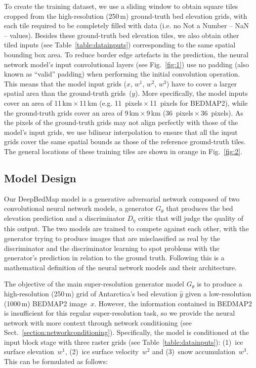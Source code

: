 \documentclass[tc, noline]{copernicus}
\begin{document}
To create the training dataset, we use a sliding window to obtain square tiles cropped from the high-resolution (250\,\unit{m}) ground-truth bed elevation grids, with each tile required to be completely filled with data (i.e.
no Not a Number -- NaN -- values).
Besides these ground-truth bed elevation tiles, we also obtain other tiled inputs (see Table~\ref{table:datainputs}) corresponding to the same spatial bounding box area.
To reduce border edge artefacts in the prediction, the neural network model's input convolutional layers (see Fig.~\ref{fig:1}) use no padding (also known as ``valid'' padding) when performing the initial convolution operation.
This means that the model input grids ($x$, $w^1$, $w^2$, $w^3$) have to cover a larger spatial area than the ground-truth grids~($y$).
More specifically, the model inputs cover an area of 11\,\unit{km}\,$\times$\,11\,\unit{km} (e.g. 11~\unit{pixels}\,$\times$\,11~\unit{pixels} for BEDMAP2), while the ground-truth grids cover an area of 9\,\unit{km}\,$\times$\,9\,\unit{km} (36~\unit{pixels}\,$\times$\,36~\unit{pixels}).
As the pixels of the ground-truth grids may not align perfectly with those of the model's input grids, we use bilinear interpolation to ensure that all the input grids cover the same spatial bounds as those of the reference ground-truth tiles.
The general locations of these training tiles are shown in orange in Fig.~\ref{fig:2}.

\subsection{Model Design} \label{section:modeldesign}

Our DeepBedMap model is a generative adversarial network \citep{GoodfellowGenerativeAdversarialNetworks2014} composed of two convolutional neural network models, a generator $G_\theta$ that produces the bed elevation prediction and a discriminator $D_\eta$ critic that will judge the quality of this output.
The two models are trained to compete against each other, with the generator trying to produce images that are misclassified as real by the discriminator and the discriminator learning to spot problems with the generator's prediction in relation to the ground truth.
Following this is a mathematical definition of the neural network models and their architecture.

The objective of the main super-resolution generator model $G_\theta$ is to produce a high-resolution (250\,\unit{m}) grid of Antarctica's bed elevation $\hat{y}$ given a low-resolution (1000\,\unit{m}) BEDMAP2 \citep{FretwellBedmap2improvedice2013} image~$x$.
However, the information contained in BEDMAP2 is insufficient for this regular super-resolution task, so we provide the neural network with more context through network conditioning (see Sect.~\ref{section:networkconditioning}).
Specifically, the model is conditioned at the input block stage with three raster grids (see Table~\ref{table:datainputs}): (1)~ice surface elevation~$w^1$, (2)~ice surface velocity~$w^2$ and (3)~snow accumulation~$w^3$.
This can be formulated as follows:
\end{document}
